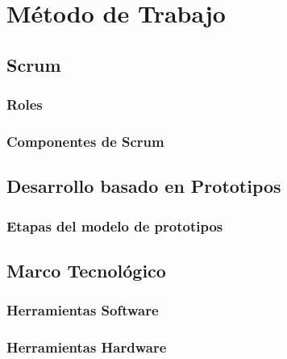 \chapter{Método de Trabajo}
\label{cap:Metodologia}

\section{Scrum}
\label{sec:Scrum}

\subsection{Roles}
\label{sec:Roles}

\subsection{Componentes de Scrum}
\label{sec:ComponentesScrum}

\section{Desarrollo basado en Prototipos}
\label{sec:Prototipos}

\subsection{Etapas del modelo de prototipos}
\label{sec:EtapasPrototipos}

\section{Marco Tecnológico}
\label{sec:MarcoTecnologico}

\subsection{Herramientas Software}
\label{sec:HerramientasSoftware}

\subsection{Herramientas Hardware}
\label{sec:HerramientasHardware}